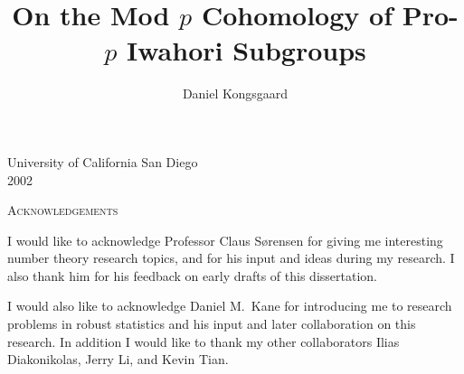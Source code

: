 \documentclass[letterpaper,oneside,english,11pt,openany]{memoir}
\title{On the Mod \texorpdfstring{$p$}{p} Cohomology of Pro-\texorpdfstring{$p$}{p} Iwahori Subgroups}
\author{Daniel Kongsgaard}
\begin{document}
\DoubleSpacing


\hypersetup{pageanchor=false}
\pagestyle{empty}



\clearpage
\null
\clearpage

\hypersetup{pageanchor=true}
\frontmatter

\pagestyle{plain}

\setcounter{page}{3}



\vfill

\begin{center}
  {\large University of California San Diego} \\[1em]
  {\large 2002}
\end{center}

\clearpage

\renewcommand{\contentsname}{Table of Contents}
\renewcommand{\cftchaptername}{\chaptername~}
\renewcommand{\cftappendixname}{\appendixname~}
\tableofcontents

\clearpage

\printnomenclature[4cm]

\clearpage

\listoftables

\clearpage


\begin{center}
  \Large\scshape Acknowledgements
\end{center}

I would like to acknowledge Professor Claus Sørensen for giving me interesting number theory research topics, and for his input and ideas during my research. I also thank him for his feedback on early drafts of this dissertation.

I would also like to acknowledge Daniel M.\ Kane for introducing me to research problems in robust statistics and his input and later collaboration on this research. In addition I would like to thank my other collaborators Ilias Diakonikolas, Jerry Li, and Kevin Tian.
\end{document}
